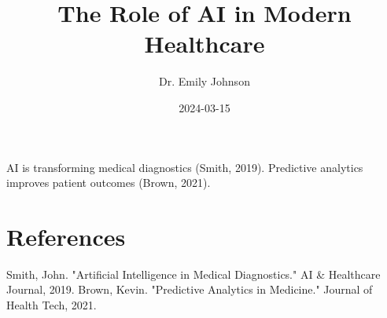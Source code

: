 \documentclass{article}
\title{The Role of AI in Modern Healthcare}
\author{Dr. Emily Johnson}
\date{2024-03-15}
\begin{document}
\maketitle
AI is transforming medical diagnostics (Smith, 2019). Predictive analytics improves patient outcomes (Brown, 2021).

\section{References}
Smith, John. "Artificial Intelligence in Medical Diagnostics." AI \& Healthcare Journal, 2019.
Brown, Kevin. "Predictive Analytics in Medicine." Journal of Health Tech, 2021.
\end{document}
